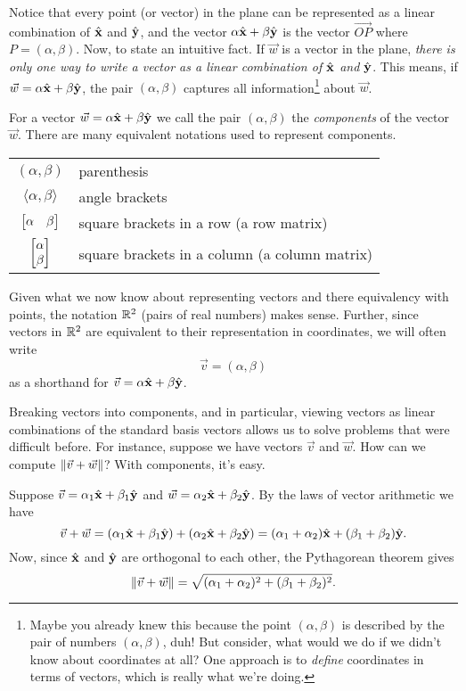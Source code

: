 Notice that every point (or vector) in the plane can be represented
as a linear combination of ${\hat {\mathbf x}}$ and ${\hat {\mathbf y}}$, and the vector
$\alpha{\hat {\mathbf x}}+\beta{\hat {\mathbf y}}$ is the vector $\overrightarrow{OP}$ where
$P=(\alpha,\beta)$.  Now, to state an intuitive fact.  If $\vec w$ is
a vector in the plane, \emph{there is
only one way to write a vector as a linear combination of
${\hat {\mathbf x}}$ and ${\hat {\mathbf y}}$}.  This means, if $\vec w=\alpha{\hat {\mathbf x}}+\beta{\hat {\mathbf y}}$,
the pair $(\alpha,\beta)$ captures all information\footnote{
	Maybe you already knew this because the point $(\alpha,\beta)$
	is described by the pair of numbers $(\alpha,\beta)$, duh!
	But consider, what would we do if we didn't know about coordinates
	at all? One approach is to \emph{define} coordinates in terms
	of vectors, which is really what we're doing.
} about $\vec w$.


For a vector $\vec w=\alpha{\hat {\mathbf x}}+\beta{\hat {\mathbf y}}$ 
we call the pair $(\alpha,\beta)$  the 
\emph{components} of the vector $\vec w$.  There
are many equivalent notations used to represent components.
\begin{center}
	\begin{tabular}{c p{5cm}}
		$(\alpha,\beta)$ & parenthesis\\
		$\langle \alpha,\beta\rangle$ & angle brackets\\
		$\mat{\alpha&\beta}$ & square brackets in a row (a row matrix)\\
		$\mat{\alpha\\\beta}$ & square brackets in a column (a column matrix)\\
	\end{tabular}
\end{center}

Given what we now know about representing vectors and there equivalency
with points, the notation $\mathbb{R}^2$ (pairs of real numbers) makes sense.  Further,
since vectors in $\mathbb{R}^2$ are equivalent to their representation in coordinates,
we will often write
\[
	\vec v=(\alpha,\beta)
\]
as a shorthand for $\vec v=\alpha{\hat {\mathbf x}}+\beta{\hat {\mathbf y}}$.


Breaking vectors into components, and in particular, viewing vectors as linear
combinations of the standard basis vectors allows us to solve problems that were
difficult before.  For instance, suppose we have vectors $\vec v$ and $\vec w$.
How can we compute $\lVert\vec v+\vec w\rVert$?  With components, it's easy.

\begin{example}
	\label{EXAMPLE-vecadd}
	Suppose $\vec v=\alpha_1{\hat {\mathbf x}}+\beta_1{\hat {\mathbf y}}$ and $\vec w=\alpha_2{\hat {\mathbf x}}+\beta_2{\hat {\mathbf y}}$.
	By the laws of vector arithmetic we have
	\[
		\vec v+\vec w=(\alpha_1{\hat {\mathbf x}}+\beta_1{\hat {\mathbf y}})+(\alpha_2{\hat {\mathbf x}}+\beta_2{\hat {\mathbf y}})
		=(\alpha_1+\alpha_2){\hat {\mathbf x}}+(\beta_1+\beta_2){\hat {\mathbf y}}.
	\]
	Now, since ${\hat {\mathbf x}}$ and ${\hat {\mathbf y}}$ are orthogonal to each other,
	the Pythagorean theorem gives
	\[
		\lVert\vec v+\vec w\rVert = \sqrt{(\alpha_1+\alpha_2)^2+(\beta_1+\beta_2)^2}.
	\]
\end{example}

